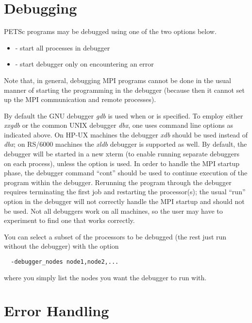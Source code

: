 \section{Debugging}  \label{sec:debugging}

PETSc programs may be debugged using one of the two options below.
\begin{itemize}
\item {}   
     - start all processes in debugger
\item {} 
       - start debugger only on encountering an error
\end{itemize}
Note that, in general, debugging MPI programs cannot be done in the usual
manner of starting the programming in the debugger (because then it cannot
set up the MPI communication and remote processes).

By default the GNU debugger {\em gdb} is used when 
or  is specified. 
To employ either {\em xxgdb} or the common UNIX debugger {\em dbx}, one uses
command line options as indicated above. On HP-UX machines the debugger
{\em xdb} should be used instead of {\em dbx}; on RS/6000 machines the
{\em xldb} debugger is supported as well.
By  default, the debugger will be started in a new xterm (to enable 
running separate debuggers on each process), unless the option 
 is used.
In order to handle the MPI startup phase, the debugger command ``cont'' 
should be used to continue execution of the program within the debugger.
Rerunning the program through the debugger requires terminating 
the first job and restarting the processor(s); the usual ``run'' 
option in the debugger will not correctly handle the MPI startup and
should not be used.  Not all debuggers work on all machines, so the user
may have to experiment to find one that works correctly.

You can select a subset of the processors to be debugged (the rest just run 
without the debugger) with the option
\begin{verbatim}
  -debugger_nodes node1,node2,...
\end{verbatim}
where you simply list the nodes you want the debugger to run with.

\section{Error Handling}   

